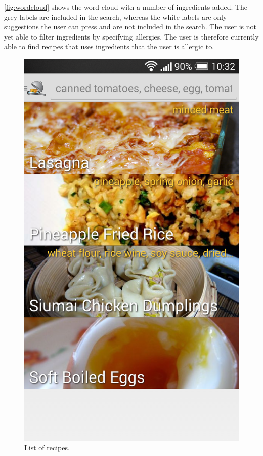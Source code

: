 \autoref{fig:wordcloud} shows the word cloud with a number of ingredients added. The grey labels are included in the search, whereas the white labels are only suggestions the user can press and are not included in the search. The user is not yet able to filter ingredients by specifying allergies. The user is therefore currently able to find recipes that uses ingredients that the user is allergic to. 

\begin{figure}[H]
\begin{minipage}[t]{0.5\columnwidth}
\centering
\includegraphics[width=0.7\columnwidth]{img/screenshots/finallist.png}
\caption{List of recipes\label{fig:recipelist}.}
\end{minipage}
\hspace{0.5cm}
\begin{minipage}[t]{0.5\columnwidth}
\centering

\end{minipage}
\end{figure}
